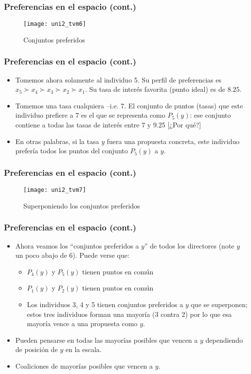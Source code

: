 \documentclass[14pt,aspectratio=169]{beamer}
\begin{document}
\begin{frame}\frametitle{Preferencias en el espacio (cont.)}
 \begin{figure}[htbp]
    \centering
    \texttt{[image: uni2\_tvm6]}
    \caption{Conjuntos preferidos}
    \label{fig:1}
  \end{figure}
\end{frame}


\begin{frame}\frametitle{Preferencias en el espacio (cont.)}
\begin{itemize}\itemsep 10pt
\item Tomemos ahora solamente al individuo 5. Su perfil de
  preferencias es $x_5 \succ x_4 \succ x_3 \succ x_2 \succ x_1$. Su
  tasa de interés favorita (punto ideal) es de $8.25$.
\item Tomemos una tasa cualquiera --i.e. $7$. El conjunto de puntos
  (tasas) que este individuo prefiere a $7$ es el que se representa
  como $P_5(y)$: ese conjunto contiene a todas las tasas de interés
  entre 7 y 9.25 [¿Por qué?]
\item En otras palabras, si la tasa $y$ fuera una propuesta concreta,
  este individuo prefería todos los puntos del conjunto $P_5(y)$ a $y$.
\end{itemize}
\end{frame}

\begin{frame}\frametitle{Preferencias en el espacio (cont.)}
 \begin{figure}[htbp]
    \centering
    \texttt{[image: uni2\_tvm7]}
    \caption{Superponiendo los conjuntos preferidos}
    \label{fig:1}
  \end{figure}
\end{frame}

\begin{frame}\frametitle{Preferencias en el espacio (cont.)}
\begin{itemize}\itemsep 10pt
\item Ahora veamos los ``conjuntos preferidos a $y$'' de todos los
  directores (note $y$ un poco abajo de $6$). Puede verse que:
\begin{itemize}\itemsep 5pt \medskip
\item $P_4(y)$ y $P_5(y)$ tienen puntos en común
\item $P_1(y)$ y $P_2(y)$ tienen puntos en común
\item Los individuos 3, 4 y 5 tienen conjuntos preferidos a $y$ que se
  superponen; estos tres individuos forman una mayoría (3 contra 2)
  por lo que esa mayoría vence a una propuesta como $y$.
\end{itemize}
\item Pueden pensarse en todas las mayorías posibles que vencen a
  $y$ dependiendo de posición de $y$ en la escala.
\item Coaliciones de mayorías posibles
  que vencen a $y$.
\end{itemize}
\end{frame}
\end{document}
